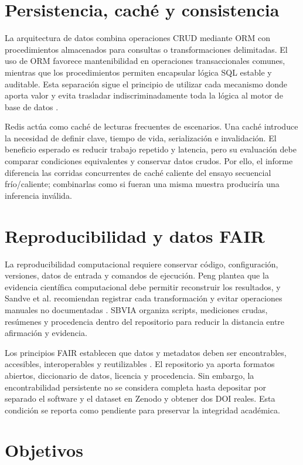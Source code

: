 \documentclass[11pt,a4paper]{report}
\begin{document}
\section{Persistencia, caché y consistencia}
La arquitectura de datos combina operaciones CRUD mediante ORM con procedimientos almacenados para consultas o transformaciones delimitadas. El uso de ORM favorece mantenibilidad en operaciones transaccionales comunes, mientras que los procedimientos permiten encapsular lógica SQL estable y auditable. Esta separación sigue el principio de utilizar cada mecanismo donde aporta valor y evita trasladar indiscriminadamente toda la lógica al motor de base de datos \cite{fowler2002patterns, kleppmann2017designing}.

Redis actúa como caché de lecturas frecuentes de escenarios. Una caché introduce la necesidad de definir clave, tiempo de vida, serialización e invalidación. El beneficio esperado es reducir trabajo repetido y latencia, pero su evaluación debe comparar condiciones equivalentes y conservar datos crudos. Por ello, el informe diferencia las corridas concurrentes de caché caliente del ensayo secuencial frío/caliente; combinarlas como si fueran una misma muestra produciría una inferencia inválida.

\section{Reproducibilidad y datos FAIR}
La reproducibilidad computacional requiere conservar código, configuración, versiones, datos de entrada y comandos de ejecución. Peng plantea que la evidencia científica computacional debe permitir reconstruir los resultados, y Sandve et al. recomiendan registrar cada transformación y evitar operaciones manuales no documentadas \cite{peng2011reproducible, sandve2013ten}. SBVIA organiza scripts, mediciones crudas, resúmenes y procedencia dentro del repositorio para reducir la distancia entre afirmación y evidencia.

Los principios FAIR establecen que datos y metadatos deben ser encontrables, accesibles, interoperables y reutilizables \cite{wilkinson2016fair}. El repositorio ya aporta formatos abiertos, diccionario de datos, licencia y procedencia. Sin embargo, la encontrabilidad persistente no se considera completa hasta depositar por separado el software y el dataset en Zenodo y obtener dos DOI reales. Esta condición se reporta como pendiente para preservar la integridad académica.

\section{Objetivos}
\end{document}
